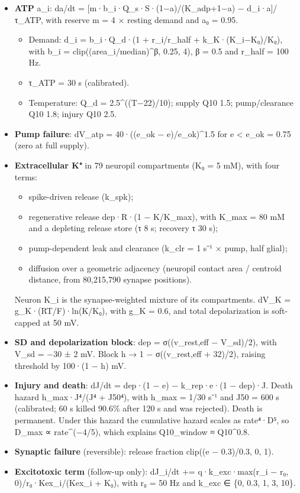 \documentclass[11pt]{article}
\providecommand{\tightlist}{\setlength{\itemsep}{0pt}\setlength{\parskip}{0pt}}
\begin{document}
\begin{itemize}
\tightlist
\item
  \textbf{ATP} a\_i: da/dt = {[}m·b\_i·Q\_s·S·(1−a)/(K\_adp+1−a) − d\_i·a{]}/τ\_ATP, with reserve m = 4 × resting demand and a₀ = 0.95.

  \begin{itemize}
  \tightlist
  \item
    Demand: d\_i = b\_i·Q\_d·(1 + r\_i/r\_half + k\_K·(K\_i−K₀)/K₀), with b\_i = clip((area\_i/median)\^{}β, 0.25, 4), β = 0.5 and r\_half = 100 Hz.
  \item
    τ\_ATP = 30 s (calibrated).
  \item
    Temperature: Q\_d = 2.5\^{}((T−22)/10); supply Q10 1.5; pump/clearance Q10 1.8; injury Q10 2.5.
  \end{itemize}
\item
  \textbf{Pump failure}: dV\_atp = 40·((e\_ok − e)/e\_ok)\^{}1.5 for e \textless{} e\_ok = 0.75 (zero at full supply).
\item
  \textbf{Extracellular K⁺} in 79 neuropil compartments (K₀ = 5 mM), with four terms:

  \begin{itemize}
  \tightlist
  \item
    spike-driven release (k\_spk);
  \item
    regenerative release dep·R·(1 − K/K\_max), with K\_max = 80 mM and a depleting release store (τ 8 s; recovery τ 30 s);
  \item
    pump-dependent leak and clearance (k\_clr = 1 s⁻¹ × pump, half glial);
  \item
    diffusion over a geometric adjacency (neuropil contact area / centroid distance, from 80,215,790 synapse positions).
  \end{itemize}

  Neuron K\_i is the synapse-weighted mixture of its compartments. dV\_K = g\_K·(RT/F)·ln(K/K₀), with g\_K = 0.6, and total depolarization is soft-capped at 50 mV.
\item
  \textbf{SD and depolarization block}: dep = σ((v\_rest,eff − V\_sd)/2), with V\_sd = −30 ± 2 mV. Block h → 1 − σ((v\_rest,eff + 32)/2), raising threshold by 100·(1 − h) mV.
\item
  \textbf{Injury and death}: dJ/dt = dep·(1 − e) − k\_rep·e·(1 − dep)·J. Death hazard h\_max·J⁴/(J⁴ + J50⁴), with h\_max = 1/30 s⁻¹ and J50 = 600 s (calibrated; 60 s killed 90.6\% after 120 s and was rejected). Death is permanent. Under this hazard the cumulative hazard scales as rate⁴·D⁵, so D\_max ∝ rate\^{}(−4/5), which explains Q10\_window ≈ Q10\^{}0.8.
\item
  \textbf{Synaptic failure} (reversible): release fraction clip((e − 0.3)/0.3, 0, 1).
\item
  \textbf{Excitotoxic term} (follow-up only): dJ\_i/dt += q·k\_exc·max(r\_i − r₀, 0)/r₀·Kex\_i/(Kex\_i + K₀), with r₀ = 50 Hz and k\_exc ∈ \{0, 0.3, 1, 3, 10\}.
\end{itemize}
\end{document}
